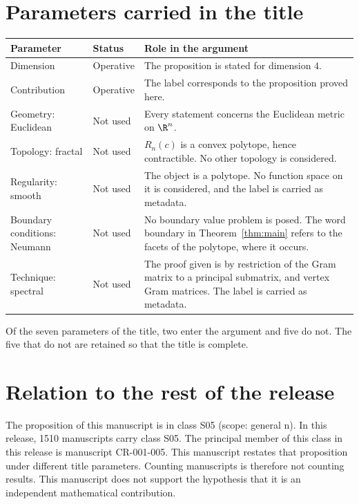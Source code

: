 \documentclass[11pt]{article}
\begin{document}
\section{Parameters carried in the title}\label{sec:params}
\begin{center}
\small
\begin{tabular}{p{}p{}p{}}
\toprule
Parameter & Status & Role in the argument \\
\midrule
Dimension & Operative & The proposition is stated for dimension $4$. \\
Contribution & Operative & The label corresponds to the proposition proved here. \\
Geometry: Euclidean & Not used & Every statement concerns the Euclidean metric on $\R^n$. \\
Topology: fractal & Not used & $R_n(c)$ is a convex polytope, hence contractible. No other topology is considered. \\
Regularity: smooth & Not used & The object is a polytope. No function space on it is considered, and the label is carried as metadata. \\
Boundary conditions: Neumann & Not used & No boundary value problem is posed. The word boundary in Theorem~\ref{thm:main} refers to the facets of the polytope, where it occurs. \\
Technique: spectral & Not used & The proof given is by restriction of the Gram matrix to a principal submatrix, and vertex Gram matrices. The label is carried as metadata. \\
\bottomrule
\end{tabular}
\end{center}
Of the seven parameters of the title, two enter the argument and five do not. The five that do not are retained so that the title is complete.

\section{Relation to the rest of the release}
The proposition of this manuscript is in class S05 (scope: general n).
In this release, 1510 manuscripts carry class S05. The principal member of this class in this release is manuscript CR-001-005. This manuscript restates that proposition under different title parameters.
Counting manuscripts is therefore not counting results. This manuscript does not support the hypothesis that it is an independent mathematical contribution.
\end{document}
